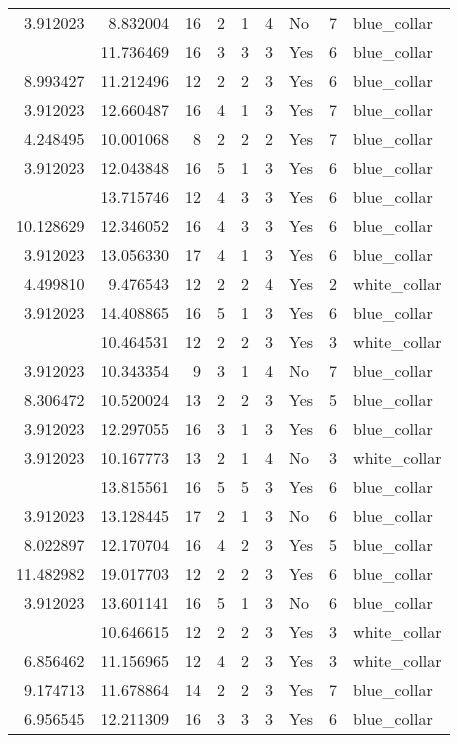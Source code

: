 \documentclass[
]{article}
\begin{document}
\begin{longtable}[t]{rrrrrllrl}
3.912023 & 8.832004 & 16 & 2 & 1 & 4 & No & 7 & blue\_collar\\
\addlinespace
10.128629 & 11.736469 & 16 & 3 & 3 & 3 & Yes & 6 & blue\_collar\\
8.993427 & 11.212496 & 12 & 2 & 2 & 3 & Yes & 6 & blue\_collar\\
3.912023 & 12.660487 & 16 & 4 & 1 & 3 & Yes & 7 & blue\_collar\\
4.248495 & 10.001068 & 8 & 2 & 2 & 2 & Yes & 7 & blue\_collar\\
3.912023 & 12.043848 & 16 & 5 & 1 & 3 & Yes & 6 & blue\_collar\\
\addlinespace
8.527143 & 13.715746 & 12 & 4 & 3 & 3 & Yes & 6 & blue\_collar\\
10.128629 & 12.346052 & 16 & 4 & 3 & 3 & Yes & 6 & blue\_collar\\
3.912023 & 13.056330 & 17 & 4 & 1 & 3 & Yes & 6 & blue\_collar\\
4.499810 & 9.476543 & 12 & 2 & 2 & 4 & Yes & 2 & white\_collar\\
3.912023 & 14.408865 & 16 & 5 & 1 & 3 & Yes & 6 & blue\_collar\\
\addlinespace
5.135798 & 10.464531 & 12 & 2 & 2 & 3 & Yes & 3 & white\_collar\\
3.912023 & 10.343354 & 9 & 3 & 1 & 4 & No & 7 & blue\_collar\\
8.306472 & 10.520024 & 13 & 2 & 2 & 3 & Yes & 5 & blue\_collar\\
3.912023 & 12.297055 & 16 & 3 & 1 & 3 & Yes & 6 & blue\_collar\\
3.912023 & 10.167773 & 13 & 2 & 1 & 4 & No & 3 & white\_collar\\
\addlinespace
12.611704 & 13.815561 & 16 & 5 & 5 & 3 & Yes & 6 & blue\_collar\\
3.912023 & 13.128445 & 17 & 2 & 1 & 3 & No & 6 & blue\_collar\\
8.022897 & 12.170704 & 16 & 4 & 2 & 3 & Yes & 5 & blue\_collar\\
11.482982 & 19.017703 & 12 & 2 & 2 & 3 & Yes & 6 & blue\_collar\\
3.912023 & 13.601141 & 16 & 5 & 1 & 3 & No & 6 & blue\_collar\\
\addlinespace
8.527143 & 10.646615 & 12 & 2 & 2 & 3 & Yes & 3 & white\_collar\\
6.856462 & 11.156965 & 12 & 4 & 2 & 3 & Yes & 3 & white\_collar\\
9.174713 & 11.678864 & 14 & 2 & 2 & 3 & Yes & 7 & blue\_collar\\
6.956545 & 12.211309 & 16 & 3 & 3 & 3 & Yes & 6 & blue\_collar\\

\end{longtable}
\end{document}
